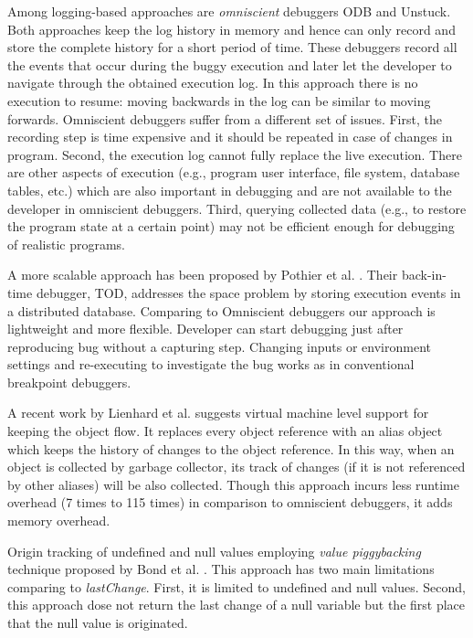 \documentclass[runningheads,a4paper]{llncs}
\begin{document}
Among logging-based approaches are \textit{omniscient} debuggers
ODB\cite{Lewis} and Unstuck\cite{Hofer}. Both
approaches keep the log history in memory and hence can only record
and store the complete history for a short period of time. These
debuggers record all the events that occur during the buggy execution
and later let the developer to navigate through the obtained execution
log. In this approach there is no execution to resume: moving
backwards in the log can be similar to moving forwards. Omniscient
debuggers suffer from a different set of issues. First, the recording
step is time expensive and it should be repeated in case of changes in
program. Second, the execution log cannot fully replace the live
execution. There are other aspects of execution (e.g., program user
interface, file system, database tables, etc.) which are also
important in debugging and are not available to the developer in
omniscient debuggers. Third, querying collected data (e.g., to restore
the program state at a certain point) may not be efficient enough for
debugging of realistic programs.

A more scalable approach has been proposed by Pothier et
al. \cite{Pothier}. Their back-in-time debugger, TOD, addresses the
space problem by storing execution events in a distributed
database. Comparing to Omniscient debuggers our approach is
lightweight and more flexible. Developer can start debugging just
after reproducing bug without a capturing step.  Changing inputs or
environment settings and re-executing to investigate the bug works as
in conventional breakpoint debuggers.

A recent work by Lienhard et al.\cite{Lienhard} suggests virtual
machine level support for keeping the object flow. It replaces every
object reference with an alias object which keeps the history of
changes to the object reference. In this way, when an object is
collected by garbage collector, its track of changes (if it is not
referenced by other aliases) will be also collected. Though this
approach incurs less runtime overhead (7 times to 115 times) in
comparison to omniscient debuggers, it adds memory
overhead. 

Origin tracking of undefined and null values employing \textit{value piggybacking} technique proposed by
Bond et al. \cite{Bond}. This approach has two main limitations comparing to \textit{lastChange}.
First, it is limited to undefined and null values. Second, this approach dose not return the last change
of a null variable but the first place that the null value is originated.
\end{document}

